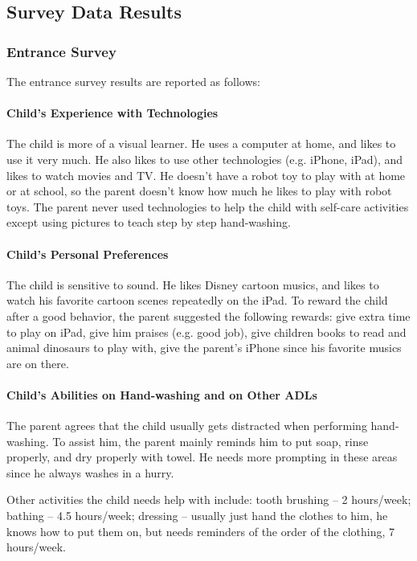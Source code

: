 \documentclass{ut-thesis}
\begin{document}
\subsection{Survey Data Results}

\subsubsection{Entrance Survey}
The entrance survey results are reported as follows:

\paragraph{Child's Experience with Technologies}
The child is more of a visual learner.  He uses a computer at home, and likes to use it very much.  He also likes to use other technologies (e.g. iPhone, iPad), and likes to watch movies and TV.  He doesn't have a robot toy to play with at home or at school, so the parent doesn't know how much he likes to play with robot toys.  The parent never used technologies to help the child with self-care activities except using pictures to teach step by step hand-washing.

\paragraph{Child's Personal Preferences}
The child is sensitive to sound.  He likes Disney cartoon musics, and likes to watch his favorite cartoon scenes repeatedly on the iPad.  To reward the child after a good behavior, the parent suggested the following rewards: give extra time to play on iPad, give him praises (e.g. good job), give children books to read and animal dinosaurs to play with, give the parent's iPhone since his favorite musics are on there.

\paragraph{Child's Abilities on Hand-washing and on Other ADLs}
The parent agrees that the child usually gets distracted when performing hand-washing.  To assist him, the parent mainly reminds him to put soap, rinse properly, and dry properly with towel.  He needs more prompting in these areas since he always washes in a hurry.

Other activities the child needs help with include:  tooth brushing -- 2 hours/week; bathing -- 4.5 hours/week; dressing -- usually just hand the clothes to him, he knows how to put them on, but needs reminders of the order of the clothing, 7 hours/week.
\end{document}
